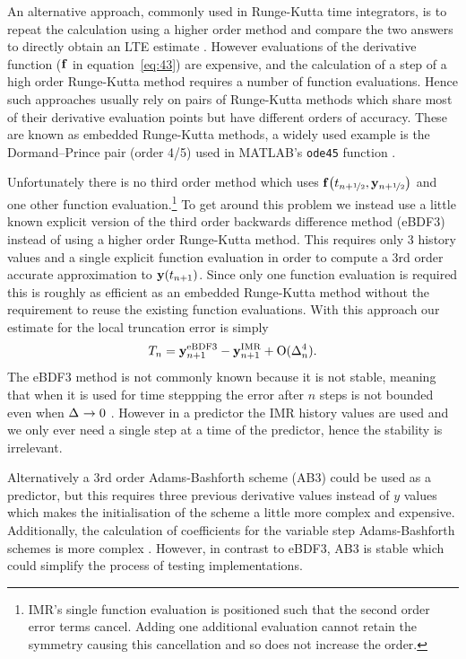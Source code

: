 An alternative approach, commonly used in Runge-Kutta time integrators, is to repeat the calculation using a higher order method and compare the two answers to directly obtain an LTE estimate \cite[pg. 165]{HairerWanner}.
However evaluations of the derivative function (${\mathbf{f}}$ in equation~\eqref{eq:43}) are expensive, and the calculation of a step of a high order Runge-Kutta method requires a number of function evaluations.
Hence such approaches usually rely on pairs of Runge-Kutta methods which share most of their derivative evaluation points but have different orders of accuracy.
These are known as embedded Runge-Kutta methods, a widely used example is the Dormand–Prince pair (order 4/5) used in MATLAB's \texttt{ode45} function \cite{matlab-ode45}.

Unfortunately there is no third order method which uses ${\mathbf{f}{\left( t_{n+\nicefrac{1}{2}}, \mathbf{y}_{n+\nicefrac{1}{2}} \right)}}$ and one other function evaluation.\footnote{IMR's single function evaluation is positioned such that the second order error terms cancel. Adding one additional evaluation cannot retain the symmetry causing this cancellation and so does not increase the order.}
To get around this problem we instead use a little known explicit version of the third order backwards difference method (eBDF3) instead of using a higher order Runge-Kutta method.
This requires only 3 history values and a single explicit function evaluation in order to compute a 3rd order accurate approximation to $\mathbf{y}(t_{n+1})$.
Since only one function evaluation is required this is roughly as efficient as an embedded Runge-Kutta method without the requirement to reuse the existing function evaluations.
With this approach our estimate for the local truncation error is simply
\begin{equation}
  \label{eq:aimr-lte-est}
  T_n = \mathbf{y}_{n+1}^{\text{eBDF3}} - \mathbf{y}_{n+1}^{\text{IMR}} + \text{O}(\Delta_{n}^4).
\end{equation}
The eBDF3 method is not commonly known because it is not stable, meaning that when it is used for time steppping the error after $n$ steps is not bounded even when $\Delta_{} \rightarrow 0$ \cite[365]{HairerNorsettWanner}.
However in a predictor the IMR history values are used and we only ever need a single step at a time of the predictor, hence the stability is irrelevant.

Alternatively a 3rd order Adams-Bashforth scheme (AB3) could be used as a predictor, but this requires three previous derivative values instead of $y$ values which makes the initialisation of the scheme a little more complex and expensive.
Additionally, the calculation of coefficients for the variable step Adams-Bashforth schemes is more complex \cite[pg. 400]{HairerNorsettWanner}.
However, in contrast to eBDF3, AB3 is stable which could simplify the process of testing implementations.


